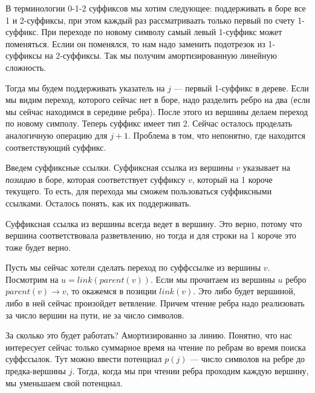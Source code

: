 \documentclass[12pt]{article}
\begin{document}
В терминологии 0-1-2 суффиксов мы хотим следующее: поддерживать в боре все 1 и 2-суффиксы, при этом каждый раз рассматриваать только первый по счету 1-суффикс. При переходе по новому символу самый левый 1-суффикс может поменяться. Еслии он поменялся, то нам надо заменить подотрезок из 1-суффиксы на 2-суффиксы. Так мы получим амортизированную линейную сложность.

Тогда мы будем поддерживать указатель на $j$ --- первый 1-суффикс в дереве. Если мы видим переход, которого сейчас нет в боре, надо разделить ребро на два (если мы сейчас находимся в середине ребра). После этого из вершины делаем переход по новому симполу. Теперь суффикс имеет тип 2. Сейчас осталось проделать аналогичную операцию для $j + 1$. Проблема в том, что непонятно, где находится соответствующий суффикс.

Введем суффиксные ссылки. Суффиксная ссылка из вершины $v$ указывает на \textit{позицию} в боре, которая соответствует суффиксу $v$, который на 1 короче текущего. То есть, для перехода мы сможем пользоваться суффиксными ссылками. Осталось понять, как их поддерживать.

Суффиксная ссылка из вершины всегда ведет в  вершину. Это верно, потому что вершина соответствовала разветвлению, но тогда и для строки на 1 короче это тоже будет верно.

Пусть мы сейчас хотели сделать переход по суффссылке из вершины $v$. Посмотрим на $u = link(parent(v))$. Если мы прочитаем из вершины $u$ ребро $parent(v) \rightarrow v$, то окажемся в позиции $link(v)$. Это либо будет вершиной, либо в ней сейчас произойдет ветвление. Причем чтение ребра надо реализовать за число вершин на пути, не за число символов.

За сколько это будет работать? Амортизированно за линию. Понятно, что нас интересует сейчас только суммарное время на чтение по ребрам во время поиска суффссылок. Тут можно ввести потенциал $p(j)$ --- число символов на ребре до предка-вершины $j$. Тогда, когда мы при чтении ребра проходим каждую вершину, мы уменьшаем свой потенциал.
\end{document}
